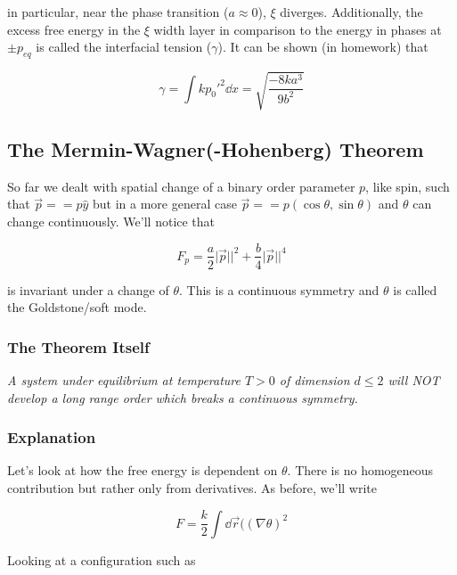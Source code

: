 in particular, near the phase transition ($a\approx 0$), $\xi$ diverges. Additionally, the excess free energy in the $\xi$ width layer in comparison to the energy in phases at $\pm p_{eq}$ is called the interfacial tension ($\gamma$). It can be shown (in homework) that 

\begin{equation}
	\gamma = \int kp_0'^2\dd x = \sqrt{\frac{-8ka^3}{9b^2}}
\end{equation}

\subsection{The Mermin-Wagner(-Hohenberg) Theorem}

So far we dealt with spatial change of a binary order parameter $p$, like spin, such that $\vec p == p\hat y$ but in a more general case $\vec p == p(\cos\theta,\sin\theta)$ and $\theta$ can change continuously. We'll notice that

\begin{equation}
	F_p = \frac{a}{2}\lvert\vec p\rvert\rvert^2+\frac{b}{4}\lvert\vec p\rvert\rvert^4
\end{equation}

is invariant under a change of $\theta$. This is a continuous symmetry and $\theta$ is called the Goldstone/soft mode.

\subsubsection{The Theorem Itself}

\emph{A system under equilibrium at temperature $T>0$ of dimension $d\leq 2$ will NOT develop a long range order which breaks a continuous symmetry.}

\subsubsection{Explanation}

Let's look at how the free energy is dependent on $\theta$. There is no homogeneous contribution but rather only from derivatives. As before, we'll write

\begin{equation}
	F = \frac{k}{2}\int \dd \vec r ((\nabla\theta)^2
\end{equation}

Looking at a configuration such as


